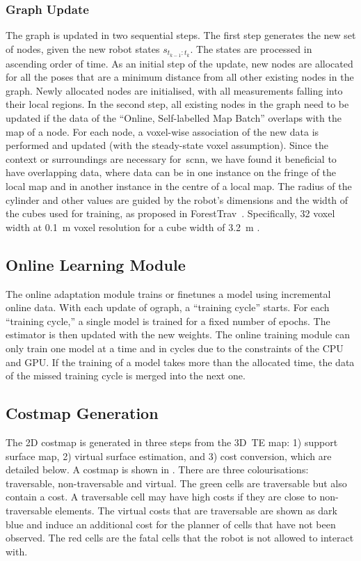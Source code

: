 \subsubsection{Graph Update}
The graph is updated in two sequential steps. The first step generates the new set of nodes, given the new robot states $s_{t_{k-1}:t_k}$. The states are processed in ascending order of time. As an initial step of the update, new nodes are allocated for all the poses that are a minimum distance from all other existing nodes in the graph. Newly allocated nodes are initialised, with all measurements falling into their local regions. In the second step, all existing nodes in the graph need to be updated if the data of the ``Online, Self-labelled Map Batch'' overlaps with the map of a node. For each node, a voxel-wise association of the new data is performed and updated (with the steady-state voxel assumption). Since the context or surroundings are necessary for~\ac{scnn}, we have found it beneficial to have overlapping data, where data can be in one instance on the fringe of the local map and in another instance in the centre of a local map. The radius of the cylinder and other values are guided by the robot's dimensions and the width of the cubes used for training, as proposed in ForestTrav~\cite{ruetz2024foresttrav}. Specifically, 32 voxel width at \qty{0.1}{\m} voxel resolution for a cube width of \qty{3.2}{\m} .
 
\subsection{Online Learning Module}
The online adaptation module trains or finetunes a model using incremental online data. With each update of \ac{ograph}, a ``training cycle'' starts. For each ``training cycle,'' a single model is trained for a fixed number of epochs. The estimator is then updated with the new weights. The online training module can only train one model at a time and in cycles due to the constraints of the CPU and GPU. If the training of a model takes more than the allocated time, the data of the missed training cycle is merged into the next one. 

\subsection{Costmap Generation}
\label{subsec:cotmap_generation}
The 2D costmap is generated in three steps from the 3D~\ac{TE} map: 1) support surface map, 2) virtual surface estimation, and 3) cost conversion, which are detailed below. A costmap is shown in . There are three colourisations: traversable, non-traversable and virtual. The green cells are traversable but also contain a cost. A traversable cell may have high costs if they are close to non-traversable elements. The virtual costs that are traversable are shown as dark blue and induce an additional cost for the planner of cells that have not been observed. The red cells are the fatal cells that the robot is not allowed to interact with. 

